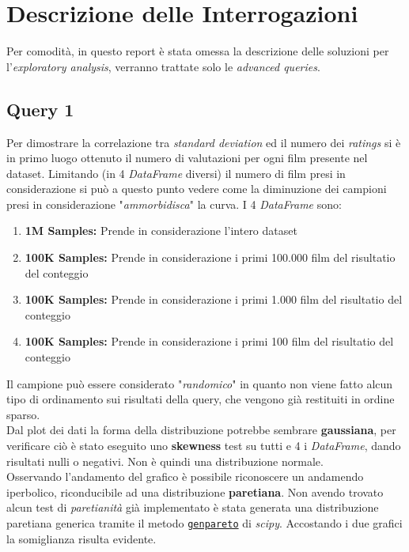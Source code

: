 \documentclass{article}
\begin{document}
    \newpage
    \section{Descrizione delle Interrogazioni}
    Per comodità, in questo report è stata omessa la descrizione delle soluzioni per l'\textit{exploratory analysis}, verranno trattate solo le \textit{advanced queries}.
    \subsection{Query 1}
        Per dimostrare la correlazione tra \textit{standard deviation} ed il numero dei \textit{ratings} si è in primo luogo ottenuto il numero di valutazioni per ogni film presente nel dataset. Limitando (in 4 \textit{DataFrame} diversi) il numero di film presi in considerazione si può a questo punto vedere come la diminuzione dei campioni presi in considerazione "\textit{ammorbidisca}" la curva. I 4 \textit{DataFrame} sono:
        \begin{enumerate}
            \item \textbf{1M Samples:} Prende in considerazione l'intero dataset
            \item \textbf{100K Samples:} Prende in considerazione i primi 100.000 film del risultatio del conteggio
            \item \textbf{100K Samples:} Prende in considerazione i primi 1.000 film del risultatio del conteggio
            \item \textbf{100K Samples:} Prende in considerazione i primi 100 film del risultatio del conteggio
        \end{enumerate}
        Il campione può essere considerato "\textit{randomico}" in quanto non viene fatto alcun tipo di ordinamento sui risultati della query, che vengono già restituiti in ordine sparso.\\
        Dal plot dei dati la forma della distribuzione potrebbe sembrare \textbf{gaussiana}, per verificare ciò è stato eseguito uno \textbf{skewness} test su tutti e 4 i \textit{DataFrame}, dando risultati nulli o negativi. Non è quindi una distribuzione normale.\\
        Osservando l'andamento del grafico è possibile riconoscere un andamendo iperbolico, riconducibile ad una distribuzione \textbf{paretiana}. Non avendo trovato alcun test di \textit{paretianità} già implementato è stata generata una distribuzione paretiana generica tramite il metodo \href{https://docs.scipy.org/doc/scipy/reference/generated/scipy.stats.genpareto.html}{\texttt{genpareto}} di \textit{scipy}. Accostando i due grafici la somiglianza risulta evidente.
\end{document}
